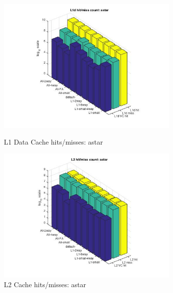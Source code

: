 \documentclass[11pt,titlepage]{article}
\begin{document}
        \begin{figure}[H]
          \centering
          \begin{minipage}{.45\textwidth}
            \includegraphics[width=9cm]{L1DHM_astar}
            \caption{L1 Data Cache hits/misses: astar}
            \label{fig:L1DHM_astar}
          \end{minipage}
          \begin{minipage}{.45\textwidth}
            \includegraphics[width=9cm]{L2HM_astar}
            \caption{L2 Cache hits/misses: astar}
            \label{fig:L2HM_astar}
          \end{minipage}
    \end{figure}
\end{document}
